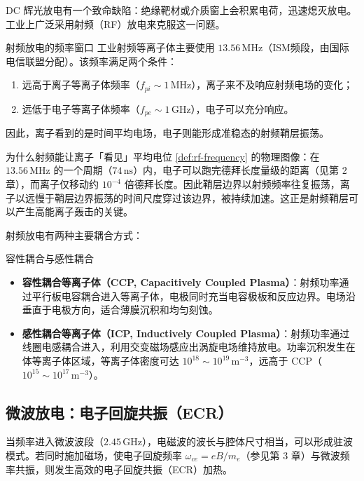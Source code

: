 \documentclass[12pt,a4paper,openany,oneside]{book}
\begin{document}
DC 辉光放电有一个致命缺陷：绝缘靶材或介质窗上会积累电荷，迅速熄灭放电。工业上广泛采用射频（RF）放电来克服这一问题。

\begin{definition}{射频放电的频率窗口}{}{}
\label{def:rf-frequency}
工业射频等离子体主要使用 $13.56\,\mathrm{MHz}$（ISM频段，由国际电信联盟分配）。该频率满足两个条件：
\begin{enumerate}
\item 远高于离子等离子体频率（$f_{pi} \sim 1\,\mathrm{MHz}$），离子来不及响应射频电场的变化；
\item 远低于电子等离子体频率（$f_{pe} \sim 1\,\mathrm{GHz}$），电子可以充分响应。
\end{enumerate}
因此，离子看到的是时间平均电场，电子则能形成准稳态的射频鞘层振荡。
\end{definition}

\begin{insight}{为什么射频能让离子「看见」平均电位}{}
\cref{def:rf-frequency} 的物理图像：在 $13.56\,\mathrm{MHz}$ 的一个周期（$74\,\mathrm{ns}$）内，电子可以跑完德拜长度量级的距离（见第 2 章），而离子仅移动约 $10^{-4}$ 倍德拜长度。因此鞘层边界以射频频率往复振荡，离子以远慢于鞘层边界振荡的时间尺度穿过该边界，被持续加速。这正是射频鞘层可以产生高能离子轰击的关键。
\end{insight}

射频放电有两种主要耦合方式：

\begin{definition}{容性耦合与感性耦合}{}{}
\label{def:ccp-icp}
\begin{itemize}
\item \textbf{容性耦合等离子体（CCP, Capacitively Coupled Plasma）}：射频功率通过平行板电容耦合进入等离子体，电极同时充当电容极板和反应边界。电场沿垂直于电极方向，适合薄膜沉积和均匀刻蚀。
\item \textbf{感性耦合等离子体（ICP, Inductively Coupled Plasma）}：射频功率通过线圈电感耦合进入，利用交变磁场感应出涡旋电场维持放电。功率沉积发生在体等离子体区域，等离子体密度可达 $10^{18}\sim 10^{19}\,\mathrm{m^{-3}}$，远高于 CCP（$10^{15}\sim 10^{17}\,\mathrm{m^{-3}}$）。
\end{itemize}
\end{definition}

\subsection{微波放电：电子回旋共振（ECR）}

当频率进入微波波段（$2.45\,\mathrm{GHz}$），电磁波的波长与腔体尺寸相当，可以形成驻波模式。若同时施加磁场，使电子回旋频率 $\omega_{ce} = eB/m_e$（参见第 3 章）与微波频率共振，则发生高效的电子回旋共振（ECR）加热。
\end{document}
